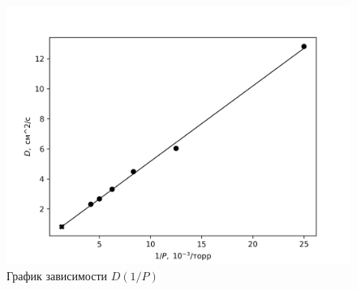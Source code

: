 \documentclass[14pt, a4paper]{report}
\begin{document}
\begin{figure}[!ht]
\centering
\includegraphics[scale=0.8]{terma_4_4.png}
\caption{График зависимости $D(1/P)$}
\end{figure}
\end{document}
